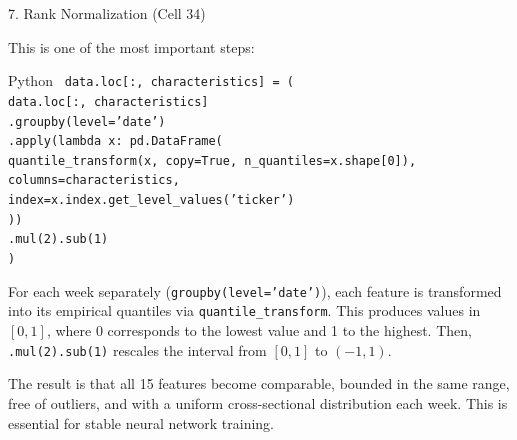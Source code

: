 \documentclass[aspectratio=169, 11pt]{beamer}
\begin{document}
%
%
\begin{frame}{7. Rank Normalization (Cell 34)}

This is one of the most important steps:

\begin{block}{Python}
\scriptsize
\texttt{
data.loc[:, characteristics] = ( \\
\hspace{0.5cm} data.loc[:, characteristics] \\
\hspace{1.0cm} .groupby(level='date') \\
\hspace{1.0cm} .apply(lambda x: pd.DataFrame( \\
\hspace{1.5cm} quantile\_transform(x, copy=True, n\_quantiles=x.shape[0]), \\
\hspace{1.5cm} columns=characteristics, \\
\hspace{1.5cm} index=x.index.get\_level\_values('ticker') \\
\hspace{1.0cm} )) \\
\hspace{1.0cm} .mul(2).sub(1) \\
)
}
\end{block}
\footnotesize
For each week separately (\texttt{groupby(level='date')}), each feature is transformed into its empirical quantiles via \texttt{quantile\_transform}. This produces values in $[0,1]$, where 0 corresponds to the lowest value and 1 to the highest. Then, \texttt{.mul(2).sub(1)} rescales the interval from $[0,1]$ to $(-1,1)$.

The result is that all 15 features become comparable, bounded in the same range, free of outliers, and with a uniform cross-sectional distribution each week. This is essential for stable neural network training.

\end{frame}
%
%
\end{document}
